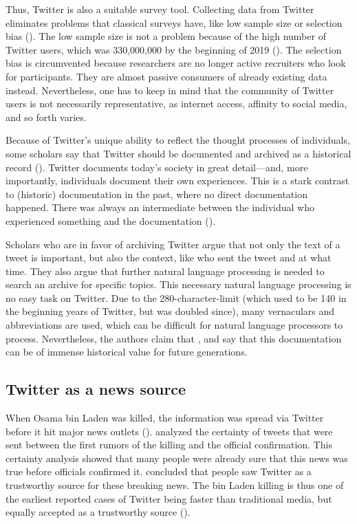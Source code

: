 Thus, Twitter is also a suitable survey tool. Collecting data from Twitter eliminates problems that classical surveys have, like low sample size or selection bias (\cite{takabeTwitterSurveyTool2016}). The low sample size is not a problem because of the high number of Twitter users, which was 330,000,000 by the beginning of 2019 (\cite{TwitterMonthlyActive}). The selection bias is circumvented because researchers are no longer active recruiters who look for participants. They are almost passive consumers of already existing data instead. Nevertheless, one has to keep in mind that the community of Twitter users is not necessarily representative, as internet access, affinity to social media, and so forth varies. %

Because of Twitter's unique ability to reflect the thought processes of individuals, some scholars say that Twitter should be documented and archived as a historical record (\cite{risse2014documenting}). Twitter documents today's society in great detail---and, more importantly, individuals document their own experiences. This is a stark contrast to (historic) documentation in the past, where no direct documentation happened. There was always an intermediate between the individual who experienced something and the documentation (\citeauthor{risse2014documenting}).

Scholars who are in favor of archiving Twitter argue that not only the text of a tweet is important, but also the context, like who sent the tweet and at what time. They also argue that further natural language processing is needed to search an archive for specific topics. This necessary natural language processing is no easy task on Twitter. Due to the 280-character-limit (which used to be 140 in the beginning years of Twitter, but was doubled since), many vernaculars and abbreviations are used, which can be difficult for natural language processors to process. Nevertheless, the authors claim that  \parencite[9]{risse2014documenting}, and say that this documentation can be of immense historical value for future generations.

\subsection{Twitter as a news source}  %
When Osama bin Laden was killed, the information was spread via Twitter before it hit major news outlets (\cite{hu2012breaking}). \citeauthor{hu2012breaking} analyzed the certainty of tweets that were sent between the first rumors of the killing and the official confirmation. This certainty analysis showed that many people were already sure that this news was true before officials confirmed it. \citeauthor{hu2012breaking} concluded that people saw Twitter as a trustworthy source for these breaking news. The bin Laden killing is thus one of the earliest reported cases of Twitter being faster than traditional media, but equally accepted as a trustworthy source (\cite[2751]{hu2012breaking}).

